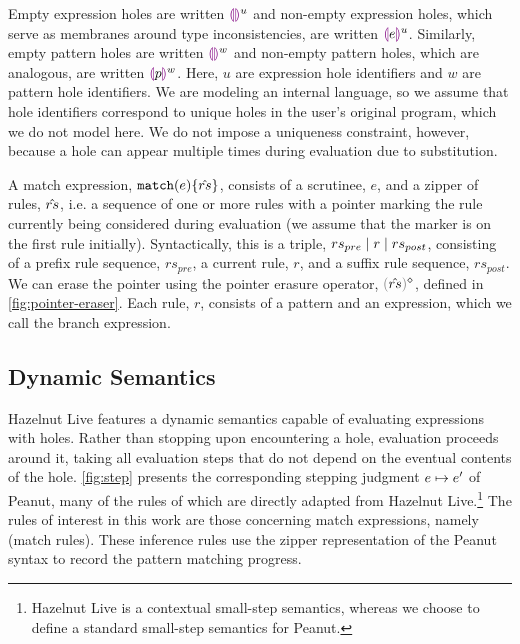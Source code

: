 Empty expression holes are written $\textcolor{violet}{\llparenthesis}\textcolor{violet}{\rrparenthesis}^{u}$ and non-empty expression holes, which serve as membranes around type inconsistencies, are written $\textcolor{violet}{\llparenthesis} e\textcolor{violet}{\rrparenthesis}^{u}$. Similarly, empty pattern holes are written $\textcolor{violet}{\llparenthesis}\textcolor{violet}{\rrparenthesis}^{w}$ and non-empty pattern holes, which are analogous, are written $\textcolor{violet}{\llparenthesis} p\textcolor{violet}{\rrparenthesis}^{w}$. Here, $u$ are expression hole identifiers and $w$ are pattern hole identifiers.
We are modeling an internal language, so we assume that hole identifiers 
correspond to unique holes in the user's original program, which we do not model here. We do not impose a uniqueness constraint, however, because a hole can 
appear multiple times during evaluation due to substitution.

A match expression, $\mathtt{match}(e) \{\hat{rs}\}$, 
consists of a scrutinee, $e$, and a zipper of rules, $\hat{rs}$, i.e. a sequence of one or more rules with a pointer marking the rule currently being considered during evaluation (we assume that the marker is on the first rule initially). Syntactically, this is a triple, $rs_{pre} \mid r \mid rs_{post}$, consisting of a prefix rule sequence, $rs_{pre}$, a current rule, $r$, and a suffix rule sequence, $rs_{post}$. We can erase the pointer using the pointer erasure operator, $\rmpointer{\zrules}$, defined in \autoref{fig:pointer-eraser}. 
Each rule, $r$, consists of a pattern and an expression, which we call the branch expression.



\subsection{Dynamic Semantics}\label{sec:dynamics}




Hazelnut Live \cite{DBLP:journals/pacmpl/OmarVCH19} features a dynamic semantics capable of evaluating expressions with holes.
Rather than stopping upon encountering a hole, evaluation proceeds around it, taking all evaluation steps that do not depend on the eventual contents of the hole.
\autoref{fig:step} presents the corresponding stepping judgment $e \mapsto e'$ of Peanut, many of the rules of which are directly adapted from Hazelnut Live.\footnote{Hazelnut Live is a contextual small-step semantics, whereas we choose to define a standard small-step semantics for Peanut.}
The rules of interest in this work are those concerning match expressions, namely (match rules\todo{}).
These inference rules use the zipper representation of the Peanut syntax to record the pattern matching progress.

